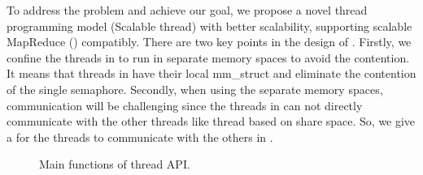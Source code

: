 

To address the problem and achieve our goal, we propose a novel thread programming model \myth (Scalable thread) with better scalability, supporting scalable MapReduce (\myds) compatibly.
There are two key points in the design of \myth.
Firstly, we confine the threads in \myth to run in separate memory spaces to avoid the contention.
It means that threads in \myth have their local mm\_struct and eliminate the contention of the single semaphore.
Secondly, when using the separate memory spaces, communication will be challenging since the threads in \myth can not directly communicate with the other threads like thread based on share space.
So, we give a  for the threads to communicate with the others in \myth. 




\label{sec:pm:thread}
\begin{figure}[htpb]

\caption{Main functions of \myds thread API.}
\label{fig:api:thread}
\end{figure}

